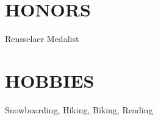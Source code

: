 \documentclass[line,margin]{res}
\begin{document}
\begin{resume}
  \section{HONORS}
  Rensselaer Medalist
  
  \section{HOBBIES}
  Snowboarding, Hiking, Biking, Reading

\end{resume}
\end{document}
